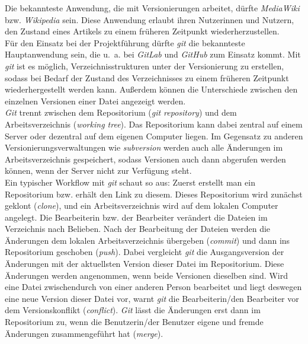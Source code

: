 \documentclass{article}
\begin{document}
        Die bekannteste Anwendung, die mit Versionierungen arbeitet, dürfte \emph{MediaWiki} bzw. \emph{Wikipedia} sein. Diese Anwendung erlaubt ihren Nutzerinnen und Nutzern, den Zustand eines Artikels zu einem früheren Zeitpunkt wiederherzustellen.\\
            
        Für den Einsatz bei der Projektführung dürfte \emph{git} die bekannteste Hauptanwendung sein, die u. a. bei \emph{GitLab} und \emph{GitHub} zum Einsatz kommt. Mit \emph{git} ist es möglich, Verzeichnisstrukturen unter der Versionierung zu erstellen, sodass bei Bedarf der Zustand des Verzeichnisses zu einem früheren Zeitpunkt wiederhergestellt werden kann. Außerdem können die Unterschiede zwischen den einzelnen Versionen einer Datei angezeigt werden.\\
            
        \emph{Git} trennt zwischen dem Repositorium (\emph{git repository}) und dem Arbeitsverzeichnis (\emph{working tree}). Das Repositorium kann dabei zentral auf einem Server oder dezentral auf dem eigenen Computer liegen. Im Gegensatz zu anderen Versionierungsverwaltungen wie \emph{subversion} werden auch alle Änderungen im Arbeitsverzeichnis gespeichert, sodass Versionen auch dann abgerufen werden können, wenn der Server nicht zur Verfügung steht.\\
            
        Ein typischer Workflow mit \emph{git} schaut so aus: Zuerst erstellt man ein Repositorium bzw. erhält den Link zu diesem. Dieses Repositorium wird zunächst geklont (\emph{clone}), und ein Arbeitsverzeichnis wird auf dem lokalen Computer angelegt. Die Bearbeiterin bzw. der Bearbeiter verändert die Dateien im Verzeichnis nach Belieben. Nach der Bearbeitung der Dateien werden die Änderungen dem lokalen Arbeitsverzeichnis übergeben (\emph{commit}) und dann ins Repositorium geschoben (\emph{push}). Dabei vergleicht \emph{git} die Ausgangsversion der Änderungen mit der aktuellsten Version dieser Datei im Repositorium. Diese Änderungen werden angenommen, wenn beide Versionen dieselben sind. Wird eine Datei zwischendurch von einer anderen Person bearbeitet und liegt deswegen eine neue Version dieser Datei vor, warnt \emph{git} die Bearbeiterin/den Bearbeiter vor dem Versionskonflikt (\emph{conflict}). \emph{Git} lässt die Änderungen erst dann im Repositorium zu, wenn die Benutzerin/der Benutzer eigene und fremde Änderungen zusammengeführt hat (\emph{merge}).\\
            
\end{document}
